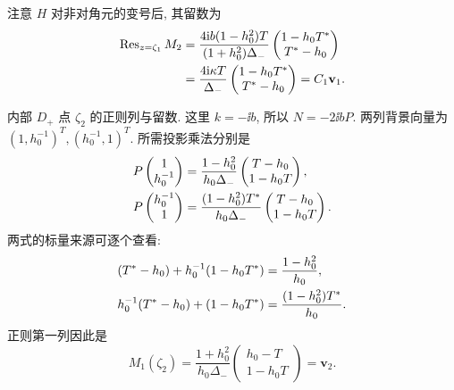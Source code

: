 注意 $H$ 对非对角元的变号后, 其留数为
\begin{equation*}
\begin{aligned}
\operatorname{Res}_{z=\zeta_1}M_2
&=\dfrac{4\mathrm{i} b(1-h_0^2)T}{(1+h_0^2)\Delta_-}
\begin{pmatrix}1-h_0{T}^{*}\\{T}^{*}-h_0\end{pmatrix}\\
&=\dfrac{4\mathrm{i}\kappa T}{\Delta_-}
\begin{pmatrix}1-h_0{T}^{*}\\{T}^{*}-h_0\end{pmatrix}
=C_1\mathbf v_1.
\end{aligned}
\end{equation*}

\par\smallskip\noindent 内部 $D_+$ 点 $\zeta_2$ 的正则列与留数.\quad
这里 $k=-\ii b$, 所以 $N=-2\ii bP$.
两列背景向量为 $(1,h_0^{-1})^T,(h_0^{-1},1)^T$.
所需投影乘法分别是
\begin{equation*}
\begin{aligned}
P\begin{pmatrix}1\\h_0^{-1}\end{pmatrix}
&=\dfrac{1-h_0^2}{h_0\Delta_-}
\begin{pmatrix}T-h_0\\1-h_0T\end{pmatrix},\\
P\begin{pmatrix}h_0^{-1}\\1\end{pmatrix}
&=\dfrac{(1-h_0^2){T}^{*}}{h_0\Delta_-}
\begin{pmatrix}T-h_0\\1-h_0T\end{pmatrix}.
\end{aligned}
\end{equation*}
两式的标量来源可逐个查看:
\begin{equation*}
\begin{aligned}
({T}^{*}-h_0)+h_0^{-1}(1-h_0{T}^{*})
&=\dfrac{1-h_0^2}{h_0},\\
h_0^{-1}({T}^{*}-h_0)+(1-h_0{T}^{*})
&=\dfrac{(1-h_0^2){T}^{*}}{h_0}.
\end{aligned}
\end{equation*}
正则第一列因此是
\begin{equation*}
M_1(\zeta_2)
=\dfrac{1+h_0^2}{h_0\Delta_-}
\begin{pmatrix}h_0-T\\1-h_0T\end{pmatrix}
=\mathbf v_2.
\end{equation*}

